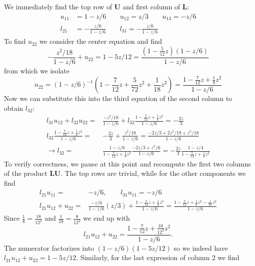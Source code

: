 \documentclass[10pt,a4paper]{article}
\newcommand{\bvec}[1]{\mathbf{#1}}
\begin{document}
We immediately find the top row of $\bvec{U}$ and first column of $\bvec{L}:$
\begin{align*}
  u_{11} &= 1 - z/6 \qquad u_{12} = z/3 \qquad u_{13} = -z/6 \\
  l_{21} &= -\frac{z/6}{1-z/6} \qquad l_{31} = -\frac{z/6}{1 - z/6}
\end{align*}
To find $u_{22}$ we consider the center equation and find
\begin{equation*}
  -\frac{z^2/18}{1-z/6} + u_{22} = 1 - 5z/12 = \frac{(1 - \frac{5}{12}z)(1 - z/6)}{1 - z/6}
\end{equation*}
from which we isolate
\begin{equation*}
  u_{22} = (1 - z/6)^{-1}\left(1 - \frac{7}{12}z + \frac{5}{72}z^2 + \frac{1}{18}z^2\right) = \frac{1 - \frac{7}{12}z + \frac{1}{8}z^2}{1 - z/6}
\end{equation*}
Now we can substitute this into the third equation of the second column to obtain $l_{32}:$
\begin{align*}
  l_{31}u_{12} + l_{32}u_{22} =& \frac{-z^2/18}{1 - z/6} + l_{32}\frac{1 - \frac{7}{12}z + \frac{1}{8}z^2}{1 - z/6} = -\frac{2z}{3} \\
  l_{32}\frac{1 - \frac{7}{12}z + \frac{1}{8}z^2}{1 - z/6} =& -\frac{2z}{3} + \frac{z^2/18}{1-z/6} = \frac{-2z/3 + 2z^2/18 + z^2/18}{1-z/6} \\
  \rightarrow l_{32} =& \frac{1 - z/6}{1 - \frac{7}{12}z + \frac{1}{8}z^2}\frac{-2z/3 + z^2/6}{1 - z/6} = -\frac{2z}{3}\frac{1 - z/4}{1 - \frac{7}{12}z + \frac{1}{8}z^2}
\end{align*}
To verify correctness, we pause at this point and recompute the first two columns of the product $\bvec{LU}.$ The top rows are trivial, while for the other components we find
\begin{align*}
  l_{21}u_{11} =& -z/6, \qquad l_{31}u_{11} = -z/6\\
  l_{21}u_{12} + u_{22} =& \frac{-z/6}{1-z/6}(z/3) + \frac{1 - \frac{7}{12}z + \frac{1}{8}z^2}{1-z/6} = \frac{1 - \frac{7}{12}z + \frac{1}{8}z^2 - \frac{1}{18}z^2}{1-z/6}
\end{align*}
Since $\frac{1}{8}=\frac{18}{12^2}$ and $\frac{1}{18}=\frac{8}{12^2}$ we end up with
\begin{equation*}
  l_{21}u_{12} + u_{22} = \frac{1 - \frac{7}{12}z + \frac{10}{12^2}z^2}{1-z/6}.
\end{equation*}
The numerator factorizes into $(1-z/6)(1-5z/12)$ so we indeed have $l_{21}u_{12} + u_{22} = 1 - 5z/12.$
Similarly, for the last expression of column 2 we find
\end{document}
